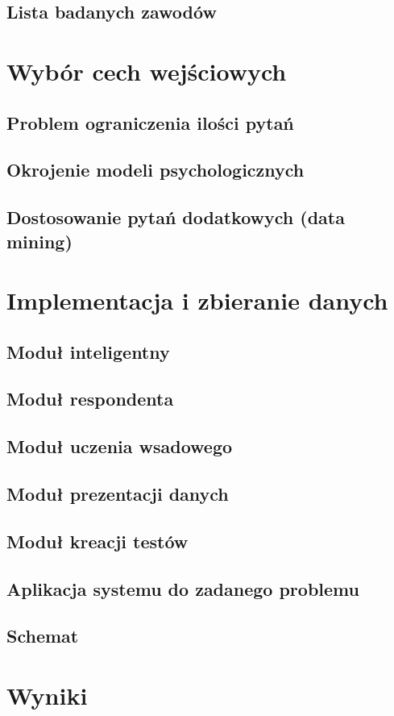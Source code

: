 \documentclass[11pt]{article} %
\begin{document}
\subsection{Lista badanych zawodów}
\section{Wybór cech wejściowych}
\subsection{Problem ograniczenia ilości pytań}
\subsection{Okrojenie modeli psychologicznych}
\subsection{Dostosowanie pytań dodatkowych (data mining)}
\section{Implementacja i zbieranie danych}
\subsection{Moduł inteligentny}
\subsection{Moduł respondenta}
\subsection{Moduł uczenia wsadowego}
\subsection{Moduł prezentacji danych}
\subsection{Moduł kreacji testów}
\subsection{Aplikacja systemu do zadanego problemu}
\subsection{Schemat}
\section{Wyniki}
\end{document}
